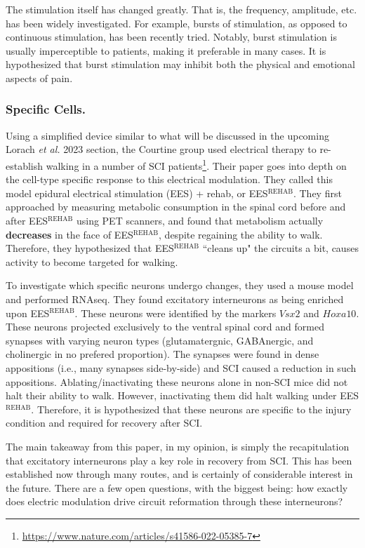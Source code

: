 \documentclass[12pt]{report}
\begin{document}
The stimulation itself has changed greatly. That is, the frequency, amplitude, etc. has been widely investigated. For example, bursts of stimulation, as opposed to continuous stimulation, has been recently tried. Notably, burst stimulation is usually imperceptible to patients, making it preferable in many cases. It is hypothesized that burst stimulation may inhibit both the physical and emotional aspects of pain. 

\subsubsection{Specific Cells.}

Using a simplified device similar to what will be discussed in the upcoming Lorach \textit{et al.} 2023 section, the Courtine group used electrical therapy to re-establish walking in a number of SCI patients\footnote{\url{https://www.nature.com/articles/s41586-022-05385-7}}. Their paper goes into depth on the cell-type specific response to this electrical modulation. They called this model epidural electrical stimulation (EES) + rehab, or EES$^{\mathrm{REHAB}}$. They first approached by measuring metabolic consumption in the spinal cord before and after EES$^{\mathrm{REHAB}}$ using PET scanners, and found that metabolism actually \textbf{decreases} in the face of EES$^{\mathrm{REHAB}}$, despite regaining the ability to walk. Therefore, they hypothesized that EES$^{\mathrm{REHAB}}$ ``cleans up" the circuits a bit, causes activity to become targeted for walking.\newline

To investigate which specific neurons undergo changes, they used a mouse model and performed RNAseq. They found excitatory interneurons as being enriched upon EES$^{\mathrm{REHAB}}$. These neurons were identified by the markers $Vsx2$ and $Hoxa10$. These neurons projected exclusively to the ventral spinal cord and formed synapses with varying neuron types (glutamatergnic, GABAnergic, and cholinergic in no prefered proportion). The synapses were found in dense appositions (i.e., many synapses side-by-side) and SCI caused a reduction in such appositions. Ablating/inactivating these neurons alone in non-SCI mice did not halt their ability to walk. However, inactivating them did halt walking under EES$^{\mathrm{REHAB}}$. Therefore, it is hypothesized that these neurons are specific to the injury condition and required for recovery after SCI.\newline

The main takeaway from this paper, in my opinion, is simply the recapitulation that excitatory interneurons play a key role in recovery from SCI. This has been established now through many routes, and is certainly of considerable interest in the future. There are a few open questions, with the biggest being: how exactly does electric modulation drive circuit reformation through these interneurons? 
\end{document}
